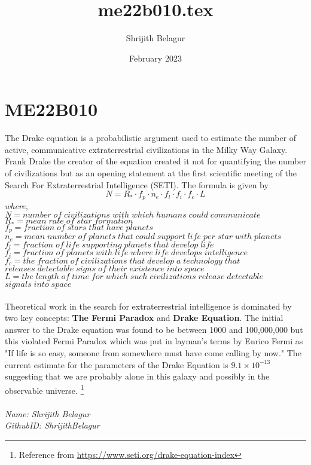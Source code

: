 \documentclass[a4paper,12pt]{article}
\title{me22b010.tex}
\author{Shrijith Belagur}
\date{February 2023}
\begin{document}
\maketitle

\section{ME22B010}
The Drake equation is a probabilistic argument used to estimate the number of active, communicative extraterrestrial civilizations in the Milky Way Galaxy. Frank Drake the creator of the equation created it not for quantifying the number of civilizations but as an opening statement at the first scientific meeting of the Search For Extraterrestrial Intelligence (SETI). The formula is given by 
$$N=R_* \cdot f_p \cdot n_e \cdot f_l \cdot f_i \cdot f_c \cdot L$$
\textit{where,}\\
\textit{$N=number\;of\;civilizations\;with\;which\;humans\;could\;communicate$}\\
\textit{$R_*=mean\;rate\;of\;star\;formation$}\\
\textit{$f_p=fraction\;of\;stars\;that\;have\;planets$}\\
\textit{$n_e=mean\;number\;of\;planets\;that\;could\;support\;life\;per\;star\;with\;planets$}\\
\textit{$f_l=fraction\;of\;life\;supporting\;planets\;that\;develop\;life$}\\
\textit{$f_i=fraction\;of\;planets\;with\;life\;where\;life\;develops\;intelligence$}\\
\textit{$f_c=the\;fraction\;of\;civilizations\;that\;develop\;a\;technology\;that$}\\
\textit{$releases\;detectable\;signs\;of\;their\;existence\;into\;space$}\\
\textit{$L=the\;length\;of\;time\;for\;which\;such\;civilizations\;release\;detectable$}\\
\textit{$signals\;into\;space$}
\\
\\
Theoretical work in the search for extraterrestrial intelligence is dominated by two key concepts: \textbf{The Fermi Paradox} and \textbf{Drake Equation}. The initial answer to the Drake equation was found to be between 1000 and 100,000,000 but this violated Fermi Paradox which was put in layman's terms by Enrico Fermi as "If life is so easy, someone from somewhere must have come calling by now." The current estimate for the parameters of the Drake Equation is $9.1 \times 10^{-13}$ suggesting that we are probably alone in this galaxy and possibly in the observable universe.
\footnote{Reference from \url{https://www.seti.org/drake-equation-index}}\\
\\
\emph{Name: Shrijith Belagur} \\
\emph{GithubID: ShrijithBelagur} \\
\end{document}
